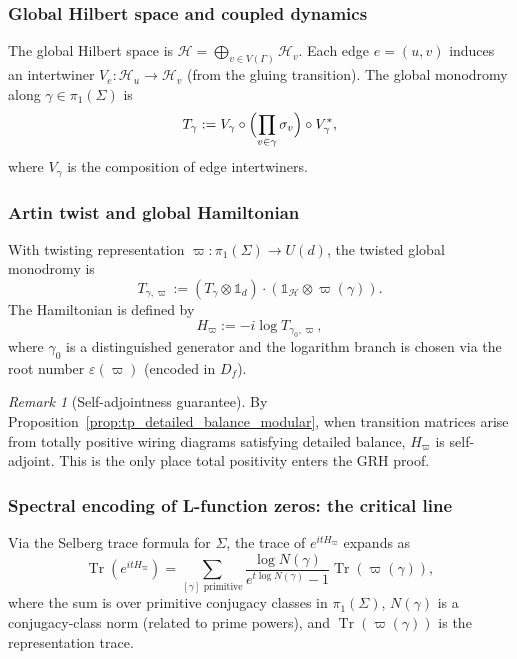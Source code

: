 \documentclass[11pt,oneside]{amsbook}
\numberwithin{equation}{section}
\theoremstyle{plain}
\theoremstyle{definition}
\theoremstyle{remark}
\newtheorem{remark}[theorem]{Remark}
\DeclareMathOperator{\Tr}{\mathrm{Tr}}
\begin{document}
\subsubsection{Global Hilbert space and coupled dynamics}

The global Hilbert space is $\mathcal{H} = \bigoplus_{v \in V(\Gamma)} \mathcal{H}_v$. Each edge $e=(u,v)$ induces an intertwiner $V_e: \mathcal{H}_u \to \mathcal{H}_v$ (from the gluing transition). The global monodromy along $\gamma \in \pi_1(\Sigma)$ is
\[T_\gamma := V_\gamma \circ \Bigl(\prod_{v \in \gamma} \sigma_v\Bigr) \circ V_\gamma^*,\]
where $V_\gamma$ is the composition of edge intertwiners.

\subsubsection{Artin twist and global Hamiltonian}

With twisting representation $\varpi:\pi_1(\Sigma) \to U(d)$, the twisted global monodromy is
\begin{equation}\label{eq:twisted_global_monodromy}
T_{\gamma,\varpi} := (T_\gamma \otimes \mathbb{1}_d) \cdot (\mathbb{1}_\mathcal{H} \otimes \varpi(\gamma)).
\end{equation}
The Hamiltonian is defined by
\begin{equation}\label{eq:total_hamiltonian_general}
H_\varpi := -i \log T_{\gamma_0,\varpi},
\end{equation}
where $\gamma_0$ is a distinguished generator and the logarithm branch is chosen via the root number $\varepsilon(\varpi)$ (encoded in $D_f$).

\begin{remark}[Self-adjointness guarantee]
By Proposition~\ref{prop:tp_detailed_balance_modular}, when transition matrices arise from totally positive wiring diagrams satisfying detailed balance, $H_\varpi$ is self-adjoint. This is the only place total positivity enters the GRH proof.
\end{remark}

\subsubsection{Spectral encoding of L-function zeros: the critical line}

Via the Selberg trace formula for $\Sigma$, the trace of $e^{itH_\varpi}$ expands as
\[\Tr(e^{itH_\varpi}) = \sum_{[\gamma] \text{ primitive}} \frac{\log N(\gamma)}{e^{t\log N(\gamma)}-1} \Tr(\varpi(\gamma)),\]
where the sum is over primitive conjugacy classes in $\pi_1(\Sigma)$, $N(\gamma)$ is a conjugacy-class norm (related to prime powers), and $\Tr(\varpi(\gamma))$ is the representation trace.
\end{document}
